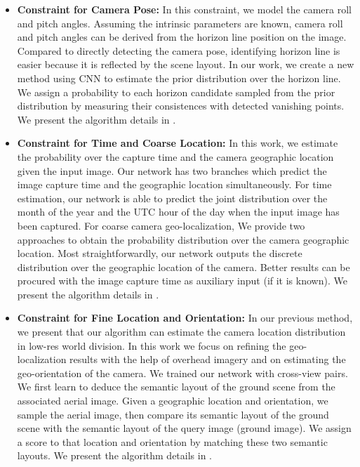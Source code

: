 \begin{itemize}[noitemsep]
  \item \textbf{Constraint for Camera Pose:}
  In this constraint, we model the camera roll and pitch angles.
  Assuming the intrinsic parameters are known, camera roll and pitch
  angles can be derived from the horizon line position on the image.
  Compared to directly detecting the camera pose, identifying horizon
  line is easier because it is reflected by the scene layout.
  In our work, we create a new method using CNN to estimate the
  prior distribution over the horizon line. We assign a probability to
  each horizon candidate sampled from the prior distribution by
  measuring their consistences with detected vanishing points. We
  present the algorithm details in .  \newline

  \item \textbf{Constraint for Time and Coarse Location:}
  In this work, we estimate the probability over the
  capture time and the camera geographic location given the input image.
  Our network has two branches which predict the image
  capture time and the geographic location simultaneously.
  For time estimation, our network is able to predict the
  joint distribution over the month of the year and the UTC hour of the
  day when the input image has been captured.
  For coarse camera geo-localization, We provide two approaches to
  obtain the probability distribution over the camera geographic
  location. Most straightforwardly, our network outputs the discrete
  distribution over the geographic location of the camera. Better
  results can be procured with the image capture time as auxiliary input
  (if it is known).  We present the algorithm details in
  .
  \newline

  \item \textbf{Constraint for Fine Location and Orientation:}
  In our previous method, we present that our algorithm can estimate
  the camera location distribution in low-res world division. In this
  work we focus on refining the geo-localization results with the help
  of overhead imagery and on estimating the geo-orientation of the camera. 
  We trained our network with cross-view pairs.
  We first learn to deduce the semantic layout of the ground
  scene from the associated aerial image.
  Given a geographic location and orientation, we sample the aerial
  image, then compare its semantic layout of the ground scene
  with the semantic layout of the query image (ground image).
  We assign a score to that location and orientation by matching these
  two semantic layouts.
  We present the algorithm details in .
  \newline

\end{itemize}


